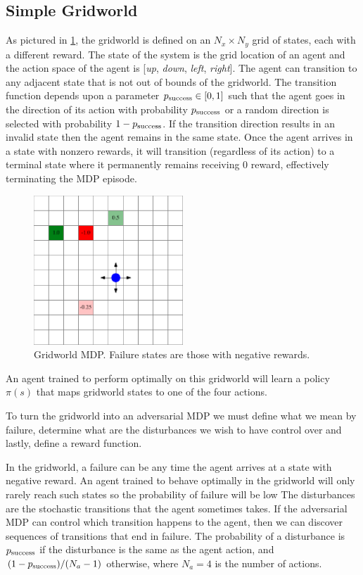 \subsection{Simple Gridworld}
As pictured in \cref{fig:simple_gridworld}, the gridworld is defined on an $N_x \times N_y$ grid of states, each with a different reward.  The state of the system is the grid location of an agent and the action space of the agent is [\emph{up}, \emph{down}, \emph{left}, \emph{right}]. The agent can transition to any adjacent state that is not out of bounds of the gridworld. The transition function depends upon a parameter $p_{\rm success} \in [0,1]$ such that the agent goes in the direction of its action with probability $p_{\rm success}$ or a random direction is selected with probability $1-p_{\rm success}$. If the transition direction results in an invalid state then the agent remains in the same state. Once the agent arrives in a state with nonzero rewards, it will transition (regardless of its action) to a terminal state where it permanently remains receiving \num{0} reward, effectively terminating the MDP episode. 

\begin{figure}
    \centering
    \includegraphics[width=0.5\textwidth]{figures/sample_systems/simple_gridworld.pdf}
    \caption{Gridworld MDP. Failure states are those with negative rewards.}
    \label{fig:simple_gridworld}
\end{figure}

An agent trained to perform optimally on this gridworld will learn a policy $\pi(s)$ that maps gridworld states to one of the four actions. 

To turn the gridworld into an adversarial MDP we must define what we mean by failure, determine what are the disturbances we wish to have control over and lastly, define a reward function. 

In the gridworld, a failure can be any time the agent arrives at a state with negative reward. 
An agent trained to behave optimally in the gridworld will only rarely reach such states so the probability of failure will be low
The disturbances are the stochastic transitions that the agent sometimes takes. If the adversarial MDP can control which transition happens to the agent, then we can discover sequences of transitions that end in failure. The probability of a disturbance is $p_{\rm success}$ if the disturbance is the same as the agent action, and $(1-p_{\rm success}) / (N_a - 1)$ otherwise, where $N_a = 4$ is the number of actions. 

